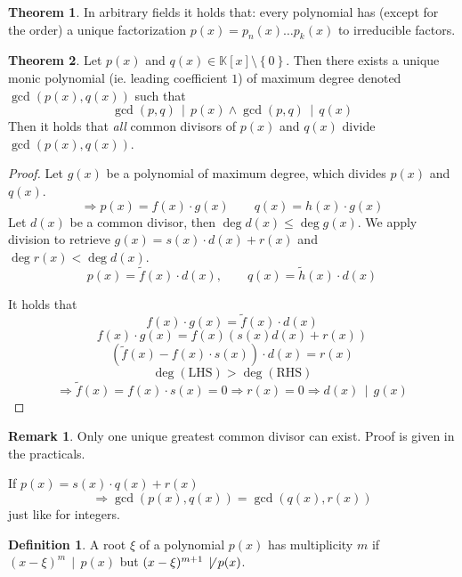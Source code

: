 \documentclass[a4paper,landscape,twocolumn]{article}
\newcommand\set[1]{\left\{#1\right\}}
\newcommand\divides[2]{#1\,\mid\,#2}
\theoremstyle{definition}
\newtheorem{theorem}{Theorem}
\newtheorem{defi}{Definition}
\newtheorem{rem}{Remark}
\begin{document}
\begin{theorem}
  \label{satz-9.27}
  In arbitrary fields it holds that:
  every polynomial has (except for the order) a unique factorization
  $p(x) = p_n(x) \ldots p_k(x)$ to irreducible factors.
\end{theorem}

\begin{theorem}
  Let $p(x)$ and $q(x) \in \mathbb K[x] \setminus \set{0}$.
  Then there exists a unique monic polynomial (ie. leading coefficient $1$)
  of maximum degree denoted $\operatorname{gcd}(p(x), q(x))$
  such that
  \[ \divides{\operatorname{gcd}(p,q)}{p(x)} \land \divides{\operatorname{gcd}(p,q)}{q(x)} \]
  Then it holds that \emph{all} common divisors of $p(x)$ and $q(x)$
  divide $\operatorname{gcd}(p(x), q(x))$.
\end{theorem}

\begin{proof}
  Let $g(x)$ be a polynomial of maximum degree, which divides $p(x)$ and $q(x)$.
  \[ \Rightarrow p(x) = f(x) \cdot g(x) \qquad q(x) = h(x) \cdot g(x) \]
  Let $d(x)$ be a common divisor, then $\deg{d(x)} \leq \deg{g(x)}$.
  We apply division to retrieve $g(x) = s(x) \cdot d(x) + r(x)$
  and $\deg{r(x)} < \deg{d(x)}$.
  \[ p(x) = \tilde{f}(x) \cdot d(x), \qquad q(x) = \tilde{h}(x) \cdot d(x) \]

  It holds that
  \[ f(x) \cdot g(x) = \tilde{f}(x) \cdot d(x) \]
  \[ f(x) \cdot g(x) = f(x) \left(s(x) d(x) + r(x)\right) \]
  \[ \left(\tilde{f}(x) - f(x) \cdot s(x)\right) \cdot d(x) = r(x) \]
  \[ \deg{(\text{LHS})} > \deg{(\text{RHS})} \]
  \[
    \Rightarrow \tilde{f}(x) = f(x) \cdot s(x) = 0
    \Rightarrow r(x)= 0 \Rightarrow \divides{d(x)}{g(x)}
  \]
\end{proof}

\begin{rem}
  Only one unique greatest common divisor can exist.
  Proof is given in the practicals.

  If $p(x) = s(x) \cdot q(x) + r(x)$
  \[ \Rightarrow \operatorname{gcd}(p(x), q(x)) = \operatorname{gcd}(q(x), r(x)) \]
  just like for integers.
\end{rem}

\begin{defi}
  A root $\xi$ of a polynomial $p(x)$ has multiplicity $m$
  if $\divides{(x - \xi)^{m}}{p(x)}$ but $(x - \xi)^{m+1} \,\not\mid\, p(x)$.
\end{defi}
\end{document}
